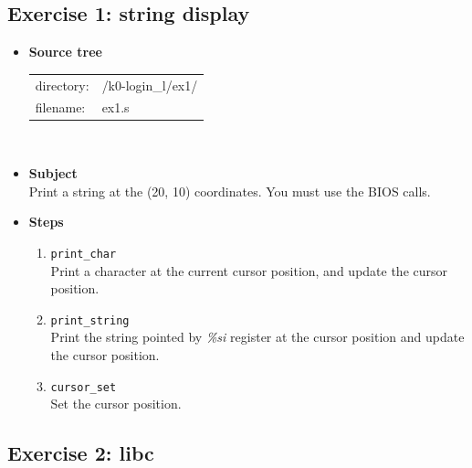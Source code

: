 \subsection*{Exercise 1: string display}
\begin{itemize}
\item {\bf Source tree}\\
\begin{tabular}{p{4cm}l}
directory: & /k0-login\_l/ex1/\\
filename: & ex1.s
\end{tabular}
\\
\item {\bf Subject}\\
Print a string at the (20, 10) coordinates. You must use the BIOS calls.\\
\item {\bf Steps}
\begin{enumerate}
\item {\tt print\_char}\\
Print a character at the current cursor position, and update the cursor position.
\item {\tt print\_string}\\
Print the string pointed by {\em \%si} register at the cursor position and update the cursor position.
\item{\tt cursor\_set}\\
Set the cursor position.
\end{enumerate}
\end{itemize}

\newpage

\subsection*{Exercise 2: libc}

